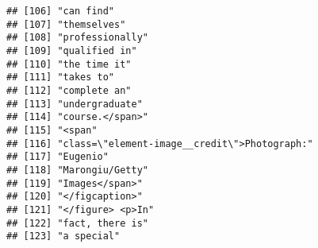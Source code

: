 \documentclass[]{article}
\begin{document}
\begin{verbatim}
## [106] "can find"                                                                                                                                 
## [107] "themselves"                                                                                                                               
## [108] "professionally"                                                                                                                           
## [109] "qualified in"                                                                                                                             
## [110] "the time it"                                                                                                                              
## [111] "takes to"                                                                                                                                 
## [112] "complete an"                                                                                                                              
## [113] "undergraduate"                                                                                                                            
## [114] "course.</span>"                                                                                                                           
## [115] "<span"                                                                                                                                    
## [116] "class=\"element-image__credit\">Photograph:"                                                                                              
## [117] "Eugenio"                                                                                                                                  
## [118] "Marongiu/Getty"                                                                                                                           
## [119] "Images</span>"                                                                                                                            
## [120] "</figcaption>"                                                                                                                            
## [121] "</figure> <p>In"                                                                                                                          
## [122] "fact, there is"                                                                                                                           
## [123] "a special"                                                                                                                                

\end{verbatim}
\end{document}
